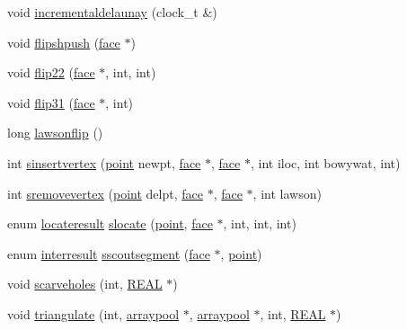 \begin{DoxyCompactItemize}
\item 
void \hyperlink{classtetgenmesh_a5a5a0513d0bea7aa457eb0bc5fad1b02}{incrementaldelaunay} (clock\-\_\-t \&)
\item 
void \hyperlink{classtetgenmesh_a5a83480cb33ea6ceebb125e20d33c324}{flipshpush} (\hyperlink{classtetgenmesh_1_1face}{face} $\ast$)
\item 
void \hyperlink{classtetgenmesh_ac34f0cd148accd132b491f9c6145c6f6}{flip22} (\hyperlink{classtetgenmesh_1_1face}{face} $\ast$, int, int)
\item 
void \hyperlink{classtetgenmesh_a3db30cb237ac5cbcda3ac70a1ea31666}{flip31} (\hyperlink{classtetgenmesh_1_1face}{face} $\ast$, int)
\item 
long \hyperlink{classtetgenmesh_acf60f3a43f8b907d95623b42a88ae968}{lawsonflip} ()
\item 
int \hyperlink{classtetgenmesh_ad48cec74c7fbcf66ebd312661da5d0bc}{sinsertvertex} (\hyperlink{classtetgenmesh_ace3fb4f80389185b7c9b18ab69a3dea2}{point} newpt, \hyperlink{classtetgenmesh_1_1face}{face} $\ast$, \hyperlink{classtetgenmesh_1_1face}{face} $\ast$, int iloc, int bowywat, int)
\item 
int \hyperlink{classtetgenmesh_a7fc2b1bb2e54a5e013edc3e23bd0523b}{sremovevertex} (\hyperlink{classtetgenmesh_ace3fb4f80389185b7c9b18ab69a3dea2}{point} delpt, \hyperlink{classtetgenmesh_1_1face}{face} $\ast$, \hyperlink{classtetgenmesh_1_1face}{face} $\ast$, int lawson)
\item 
enum \hyperlink{classtetgenmesh_a1d02bed7b59566d57b896776d78a6b25}{locateresult} \hyperlink{classtetgenmesh_ac3501a618bd4f4102d0f4722c7de3926}{slocate} (\hyperlink{classtetgenmesh_ace3fb4f80389185b7c9b18ab69a3dea2}{point}, \hyperlink{classtetgenmesh_1_1face}{face} $\ast$, int, int, int)
\item 
enum \hyperlink{classtetgenmesh_a01d2be902350e1bf8f20e650d687a793}{interresult} \hyperlink{classtetgenmesh_a6317b6e8e758e18656ed7080a96fb9b6}{sscoutsegment} (\hyperlink{classtetgenmesh_1_1face}{face} $\ast$, \hyperlink{classtetgenmesh_ace3fb4f80389185b7c9b18ab69a3dea2}{point})
\item 
void \hyperlink{classtetgenmesh_a2473a9f86cb5829968a01fdad0d3df7d}{scarveholes} (int, \hyperlink{tetgen_8h_a4b654506f18b8bfd61ad2a29a7e38c25}{R\-E\-A\-L} $\ast$)
\item 
void \hyperlink{classtetgenmesh_af62b4d5ed09b5a10704caf321e9c5b06}{triangulate} (int, \hyperlink{classtetgenmesh_1_1arraypool}{arraypool} $\ast$, \hyperlink{classtetgenmesh_1_1arraypool}{arraypool} $\ast$, int, \hyperlink{tetgen_8h_a4b654506f18b8bfd61ad2a29a7e38c25}{R\-E\-A\-L} $\ast$)

\end{DoxyCompactItemize}
